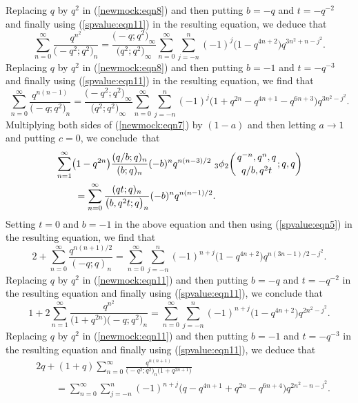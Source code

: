 \documentclass[pdftex]{sigma}
\numberwithin{equation}{section}
\begin{document}
Replacing $q$ by $q^2$ in (\ref{newmock:eqn8}) and then putting $b=-q$ and $t=-q^{-2}$ and finally using (\ref{spvalue:eqn11}) in the resulting equation, we deduce that
\begin{equation*}%
\sum_{n=0}^{\infty}\frac{q^{n^2}}{\bigl(-q^2; q^2\bigr)_n}=\frac{\bigl(-q; q^2\bigr)_\infty}{\bigl(q^2; q^2\bigr)_\infty}
\sum_{n=0}^\infty \sum_{j=-n}^{n} (-1)^j \bigl(1-q^{4n+2}\bigr) q^{3n^2+n-j^2}.
\end{equation*}
Replacing $q$ by $q^2$ in (\ref{newmock:eqn8}) and then putting $b=-1$ and $t=-q^{-3}$ and finally using (\ref{spvalue:eqn11}) in the resulting equation, we find that
\begin{equation*}%
\sum_{n=0}^{\infty}\frac{q^{n(n-1)}}{\bigl(-q; q^2\bigr)_n}=\frac{\bigl(-q^2; q^2\bigr)_\infty}{\bigl(q^2; q^2\bigr)_\infty}
\sum_{n=0}^\infty \sum_{j=-n}^{n} (-1)^j \bigl(1+q^{2n}-q^{4n+1}-q^{6n+3}\bigr) q^{3n^2-j^2}.
\end{equation*}
Multiplying both sides of (\ref{newmock:eqn7}) by $(1-a)$ and then letting $a \to 1$ and putting $c=0$, we conclude~that
\begin{align}
		&\sum_{n=1}^\infty \bigl(1-q^{2n}\bigr) \frac{(q/b; q)_n}{(b; q)_n} (-b)^n q^{n(n-3)/2}~{_3\phi_2}\biggl({{q^{-n}, q^n, q}\atop{q/b, q^2 t}}; q, q\biggr)\nonumber\\
		&\qquad{}=
		\sum_{n=0}^{\infty}\frac{(qt; q)_n}{\bigl(b, q^2t; q\bigr)_n}(-b)^n q^{n(n-1)/2}.\label{newmock:eqn11}
	\end{align}	
Setting $t=0$ and $b=-1$ in the above equation and then using (\ref{spvalue:eqn5}) in the resulting equation, we find that
\begin{equation*}%
2+\sum_{n=0}^{\infty}\frac{q^{n(n+1)/2}}{(-q; q)_n}
=\sum_{n=0}^{\infty}\sum_{j=-n}^{n}(-1)^{n+j} \bigl(1-q^{4n+2}\bigr) q^{n(3n-1)/2-j^2}.
\end{equation*}
Replacing $q$ by $q^2$ in (\ref{newmock:eqn11}) and then putting $b=-q$ and $t=-q^{-2}$ in the resulting equation and finally using
(\ref{spvalue:eqn11}), we conclude that
\begin{equation*}%
1+2\sum_{n=1}^{\infty} \frac{q^{n^2}}{\bigl(1+q^{2n}\bigr)\bigl(-q; q^2\bigr)_n}
=\sum_{n=0}^{\infty}\sum_{j=-n}^{n}(-1)^{n+j} \bigl(1-q^{4n+2}\bigr) q^{2n^2-j^2}.
\end{equation*}
Replacing $q$ by $q^2$ in (\ref{newmock:eqn11}) and then putting $b=-1$ and $t=-q^{-3}$ in the resulting equation and finally using
(\ref{spvalue:eqn11}), we deduce that
\begin{align*}%
&2q+(1+q)\sum_{n=0}^{\infty} \frac{q^{n(n+1)}}{\bigl(-q^2; q^2\bigr)_n \bigl(1+q^{2n+1}\bigr)}\\
&\qquad{}=\sum_{n=0}^{\infty}\sum_{j=-n}^{n} (-1)^{n+j} \bigl(q-q^{4n+1}+q^{2n}-q^{6n+4}\bigr) q^{2n^2-n-j^2}. \nonumber
\end{align*}
\end{document}
